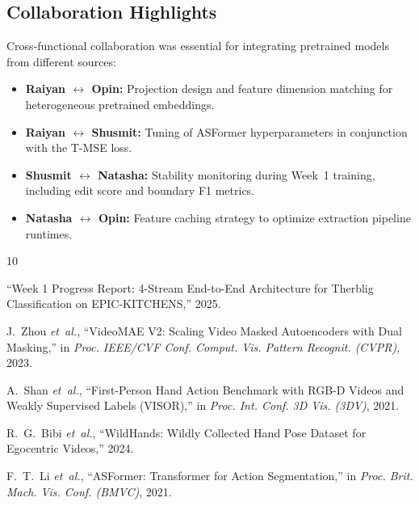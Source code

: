 \documentclass[11pt,a4paper]{article}
\begin{document}
\subsection{Collaboration Highlights}

Cross-functional collaboration was essential for integrating pretrained models from different sources:

\begin{itemize}[nosep]
  \item \textbf{Raiyan $\leftrightarrow$ Opin:} Projection design and feature dimension matching for heterogeneous pretrained embeddings.
  \item \textbf{Raiyan $\leftrightarrow$ Shusmit:} Tuning of ASFormer hyperparameters in conjunction with the T-MSE loss.
  \item \textbf{Shusmit $\leftrightarrow$ Natasha:} Stability monitoring during Week~1 training, including edit score and boundary F1 metrics.
  \item \textbf{Natasha $\leftrightarrow$ Opin:} Feature caching strategy to optimize extraction pipeline runtimes.
\end{itemize}

\begin{thebibliography}{10}

  ``Week 1 Progress Report: 4-Stream End-to-End Architecture for Therblig Classification on EPIC-KITCHENS,'' 2025.

  J.~Zhou \textit{et~al.}, ``VideoMAE V2: Scaling Video Masked Autoencoders with Dual Masking,'' in \textit{Proc. IEEE/CVF Conf. Comput. Vis. Pattern Recognit. (CVPR)}, 2023.

  A.~Shan \textit{et~al.}, ``First-Person Hand Action Benchmark with RGB-D Videos and Weakly Supervised Labels (VISOR),'' in \textit{Proc. Int. Conf. 3D Vis. (3DV)}, 2021.

  R.~G.~Bibi \textit{et~al.}, ``WildHands: Wildly Collected Hand Pose Dataset for Egocentric Videos,'' 2024.

  F.~T.~Li \textit{et~al.}, ``ASFormer: Transformer for Action Segmentation,'' in \textit{Proc. Brit. Mach. Vis. Conf. (BMVC)}, 2021.

\end{thebibliography}
\end{document}
